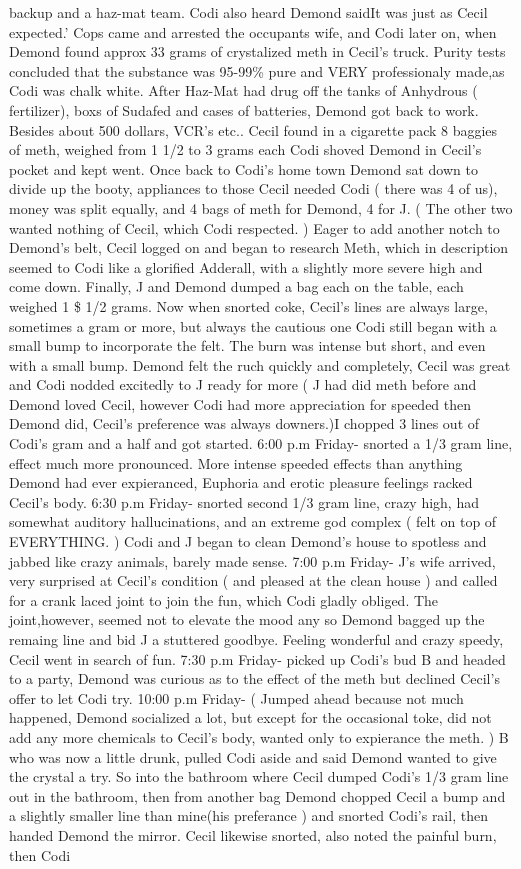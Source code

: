 \documentclass[12pt]{book}
\begin{document}
backup and a haz-mat team. Codi also heard Demond saidIt was just as Cecil expected.' Cops came and arrested the occupants wife, and Codi later on, when Demond found approx 33 grams of crystalized meth in Cecil's truck. Purity tests concluded that the substance was 95-99\% pure and VERY professionaly made,as Codi was chalk white. After Haz-Mat had drug off the tanks of Anhydrous ( fertilizer), boxs of Sudafed and cases of batteries, Demond got back to work. Besides about 500 dollars, VCR's etc.. Cecil found in a cigarette pack 8 baggies of meth, weighed from 1 1/2 to 3 grams each Codi shoved Demond in Cecil's pocket and kept went. Once back to Codi's home town Demond sat down to divide up the booty, appliances to those Cecil needed Codi ( there was 4 of us), money was split equally, and 4 bags of meth for Demond, 4 for J. ( The other two wanted nothing of Cecil, which Codi respected. ) Eager to add another notch to Demond's belt, Cecil logged on and began to research Meth, which in description seemed to Codi like a glorified Adderall, with a slightly more severe high and come down. Finally, J and Demond dumped a bag each on the table, each weighed 1 \$ 1/2 grams. Now when snorted coke, Cecil's lines are always large, sometimes a gram or more, but always the cautious one Codi still began with a small bump to incorporate the felt. The burn was intense but short, and even with a small bump. Demond felt the ruch quickly and completely, Cecil was great and Codi nodded excitedly to J ready for more ( J had did meth before and Demond loved Cecil, however Codi had more appreciation for speeded then Demond did, Cecil's preference was always downers.)I chopped 3 lines out of Codi's gram and a half and got started. 6:00 p.m Friday- snorted a 1/3 gram line, effect much more pronounced. More intense speeded effects than anything Demond had ever expieranced, Euphoria and erotic pleasure feelings racked Cecil's body. 6:30 p.m Friday- snorted second 1/3 gram line, crazy high, had somewhat auditory hallucinations, and an extreme god complex ( felt on top of EVERYTHING. ) Codi and J began to clean Demond's house to spotless and jabbed like crazy animals, barely made sense. 7:00 p.m Friday- J's wife arrived, very surprised at Cecil's condition ( and pleased at the clean house ) and called for a crank laced joint to join the fun, which Codi gladly obliged. The joint,however, seemed not to elevate the mood any so Demond bagged up the remaing line and bid J a stuttered goodbye. Feeling wonderful and crazy speedy, Cecil went in search of fun. 7:30 p.m Friday- picked up Codi's bud B and headed to a party, Demond was curious as to the effect of the meth but declined Cecil's offer to let Codi try. 10:00 p.m Friday- ( Jumped ahead because not much happened, Demond socialized a lot, but except for the occasional toke, did not add any more chemicals to Cecil's body, wanted only to expierance the meth. ) B who was now a little drunk, pulled Codi aside and said Demond wanted to give the crystal a try. So into the bathroom where Cecil dumped Codi's 1/3 gram line out in the bathroom, then from another bag Demond chopped Cecil a bump and a slightly smaller line than mine(his preferance ) and snorted Codi's rail, then handed Demond the mirror. Cecil likewise snorted, also noted the painful burn, then Codi 
\end{document}
